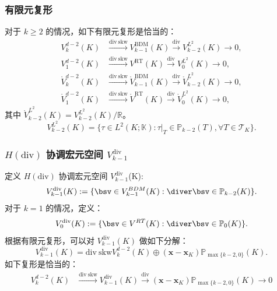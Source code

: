 \documentclass[notheorems,serif]{beamer}
\begin{document}
\begin{frame}
    \frametitle{有限元复形}
    对于 $k\geq2$ 的情况，如下有限元复形是恰当的：
    $$
    \begin{aligned}
        V_{k}^{d-2}(K) & \xrightarrow{\mathrm{div~skw}}
        V_{k-1}^{\mathrm{BDM}}(K) \xrightarrow{\mathrm{div}} V_{k-2}^{L^{2}}(K)
        \to 0,\\
        V_{1}^{d-2}(K) & \xrightarrow{\mathrm{div~skw}}
        V^{\mathrm{RT}}(K) \xrightarrow{\mathrm{div}} V_{0}^{L^{2}}(K)
        \to 0,\\
        \mathring{V}_{k}^{d-2}(K) & \xrightarrow{\mathrm{div~skw}}
        \mathring{V}_{k-1}^{\mathrm{BDM}}(K) \xrightarrow{\mathrm{div}}
        \mathring{V}_{k-2}^{L^{2}}(K) \to 0,\\
        \mathring{V}_{1}^{d-2}(K) & \xrightarrow{\mathrm{div~skw}}
        \mathring{V}^{\mathrm{RT}}(K) \xrightarrow{\mathrm{div}}
        \mathring{V}_{0}^{L^{2}}(K) \to 0,
    \end{aligned}
    $$
    其中 $\mathring{V}_{k-2}^{L^{2}}(K) = V_{k-2}^{L^{2}}(K) / \mathbb{R}$。
    $$
    V_{k-2}^{L^{2}}(K) = \{\tau \in L^2(K; \mathbb{K}) : \tau|_T \in
    \mathbb{P}_{k-2}(T), \forall T \in \mathcal{T}_K\}.
    $$
\end{frame}

\begin{frame}
    \frametitle{$H(\mathrm{div})$ 协调宏元空间 $V^{\mathrm{div}}_{k-1}$}
    定义 $H(\mathrm{div})$ 协调宏元空间 $V^{\mathrm{div}}_{k-1}$(K):
    $$
    V^{\mathrm{div}}_{k-1}(K) := \{\bsv \in V^{BDM}_{k-1}(K) : \diver
    \bsv \in \mathbb{P}_{k-2}(K)\}.
    $$
    对于 $k=1$ 的情况，定义：
    $$
    V^{\mathrm{div}}_{0}(K) := \{\bsv \in V^{RT}(K) : \diver
    \bsv \in \mathbb{P}_{0}(K)\}.
    $$
    根据有限元复形，可以对 $V^{\mathrm{div}}_{k-1}(K)$ 做如下分解：
    $$
    V^{\mathrm{div}}_{k-1}(K) = \mathrm{div~skw}V_{k}^{d-2}(K) \oplus 
    (\boldsymbol{x-x}_K)\mathbb{P}_{\max\{k-2, 0\}}(K).
    $$
    如下复形是恰当的：
    $$
    \begin{aligned}
        V_{k}^{d-2}(K) & \xrightarrow{\mathrm{div~skw}}
        V^{\mathrm{div}}_{k-1}(K) \xrightarrow{\mathrm{div}}
        (\boldsymbol{x-x}_K)\mathbb{P}_{\max\{k-2, 0\}}(K) \to 0
    \end{aligned}
    $$
\end{frame}
\end{document}
